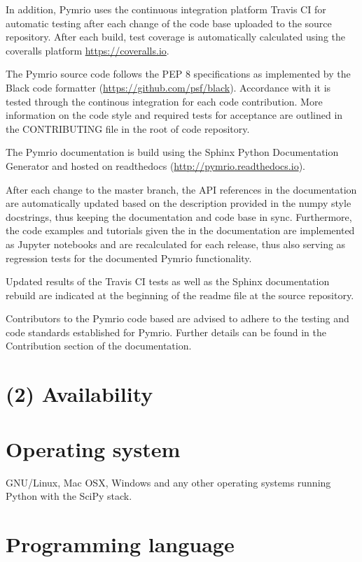 \documentclass{jors}
\begin{document}
In addition, Pymrio uses the continuous integration platform Travis CI for automatic testing after each change of the code base uploaded to the source repository. After each build, test coverage is automatically calculated using the coveralls platform \url{https://coveralls.io}.

The Pymrio source code follows the PEP 8 specifications as implemented by the Black code formatter (\url{https://github.com/psf/black}). Accordance with it is tested through the continous integration for each code contribution. More information on the code style and required tests for acceptance are outlined in the CONTRIBUTING file in the root of code repository. 

The Pymrio documentation is build using the Sphinx Python Documentation Generator and hosted on readthedocs (\url{http://pymrio.readthedocs.io}).

After each change to the master branch, the API references in the documentation are automatically updated based on the description provided in the numpy style docstrings, thus keeping the documentation and code base in sync.
Furthermore, the code examples and tutorials given the in the documentation are implemented as Jupyter notebooks and are recalculated for each release, thus also serving as regression tests for the documented Pymrio functionality.

Updated results of the Travis CI tests as well as the Sphinx documentation rebuild are indicated at the beginning of the readme file at the source repository. 

Contributors to the Pymrio code based are advised to adhere to the testing and code standards established for Pymrio. Further details can be found in the Contribution section of the documentation. 

\section*{(2) Availability}
\vspace{0.5cm}
\section*{Operating system}

GNU/Linux, Mac OSX, Windows and any other operating systems running Python with the SciPy stack.

\section*{Programming language}
\end{document}
